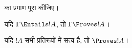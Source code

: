 \documentclass[../../../include/open-logic-section]{subfiles}
\begin{document}
\begin{prob}
 का प्रमाण पूरा कीजिए।
\end{prob}

\begin{cor}
यदि $\Gamma \Entails !A$, तो $\Gamma \Proves !A$।
\end{cor}

\begin{cor}
यदि $!A$ सभी प्रतिरूपों में सत्य है, तो $\Proves !A$।
\end{cor}
\end{document}
